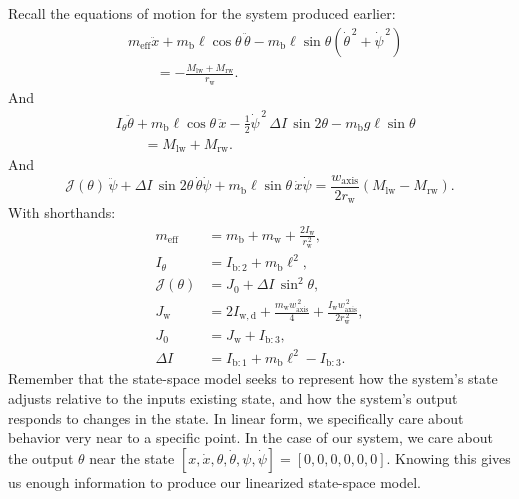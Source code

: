\documentclass[journal]{IEEEtran}
\begin{document}
Recall the equations of motion for the system produced earlier:
\begin{align}
    &m_{\mathrm{eff}}
    \ddot{x}
    +
    m_{\mathrm b}\ell
    \cos\theta\,\ddot{\theta}
    -
    m_{\mathrm b}\ell
    \sin\theta
    \left(
        \dot{\theta}^{\,2}
        +
        \dot{\psi}^{\,2}
    \right)
    \nonumber\\
    &\qquad
    =
    -\frac{M_{\mathrm{lw}}+M_{\mathrm{rw}}}{r_{\mathrm w}}.
    \label{eq:translation_eom}
\end{align}
And
\begin{align}
    &I_{\theta}
    \ddot{\theta}
    +
    m_{\mathrm b}\ell
    \cos\theta\,\ddot{x}
    -
    \frac{1}{2}\dot{\psi}^{\,2}\,
    \Delta I\,\sin2\theta
    -
    m_{\mathrm b}g\ell\sin\theta
    \nonumber\\
    &\qquad
    =
    M_{\mathrm{lw}} + M_{\mathrm{rw}}.
    \label{eq:angular_eom}
\end{align}
And
\begin{equation}
    \mathcal{J}(\theta)\,\ddot{\psi}
    +
    \Delta I\,\sin2\theta\,\dot{\theta}\dot{\psi}
    +
    m_{\mathrm b}\ell\sin\theta\,\dot{x}\dot{\psi}
    =
    \frac{w_{\mathrm{axis}}}{2r_{\mathrm w}}
    \left(
        M_{\mathrm{lw}}
        -
        M_{\mathrm{rw}}
    \right).
    \label{eq:yaw_eom}
\end{equation}
With shorthands:
\begin{align}
    m_{\mathrm{eff}}
    &=
    m_{\mathrm b}+m_{\mathrm w}+\frac{2I_{\mathrm w}}{r_{\mathrm w}^{\,2}},
    \label{eq:m_eff}
    \\
    I_{\theta}
    &=
    I_{\mathrm b:2}+m_{\mathrm b}\ell^2,
    \label{eq:I_theta}
    \\
    \mathcal{J}(\theta)
    &=
    J_0 + \Delta I\,\sin^2\theta,
    \label{eq:yaw_inertia}
    \\
    J_{\mathrm w}
    &=
    2I_{\mathrm{w,d}}
    +
    \frac{m_{\mathrm w}w_{\mathrm{axis}}^{\,2}}{4}
    +
    \frac{I_{\mathrm w}w_{\mathrm{axis}}^{\,2}}{2r_{\mathrm w}^{\,2}},
    \nonumber\\
    J_0
    &=
    J_{\mathrm w} + I_{\mathrm b:3},
    \nonumber\\
    \Delta I
    &=
    I_{\mathrm b:1} + m_{\mathrm b}\ell^2 - I_{\mathrm b:3}.
    \label{eq:yaw_inertia_constants}
\end{align}
Remember that the state-space model seeks to represent how the system's state 
adjusts relative to the inputs existing state, and how the system's output responds to changes 
in the state. In linear form, we specifically care about behavior very near to a specific point. 
In the case of our system, we care about the output $\theta$ near the state 
$[x, \dot{x}, \theta, \dot{\theta}, \psi, \dot{\psi}] = [0, 0, 0, 0, 0, 0]$. 
Knowing this gives us enough information to  produce our linearized state-space model.
\end{document}
